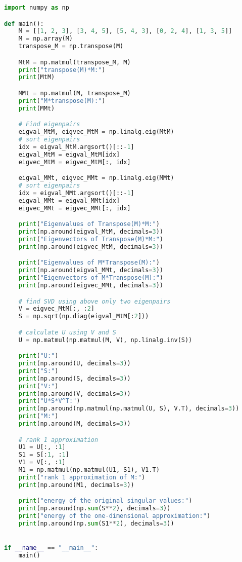 \documentclass{article}
\begin{document}
\begin{lstlisting}[language=Python]
import numpy as np

def main():
    M = [[1, 2, 3], [3, 4, 5], [5, 4, 3], [0, 2, 4], [1, 3, 5]]
    M = np.array(M)
    transpose_M = np.transpose(M)

    MtM = np.matmul(transpose_M, M)
    print("transpose(M)*M:")
    print(MtM)

    MMt = np.matmul(M, transpose_M)
    print("M*transpose(M):")
    print(MMt)

    # Find eigenpairs
    eigval_MtM, eigvec_MtM = np.linalg.eig(MtM)
    # sort eigenpairs
    idx = eigval_MtM.argsort()[::-1]
    eigval_MtM = eigval_MtM[idx]
    eigvec_MtM = eigvec_MtM[:, idx]

    eigval_MMt, eigvec_MMt = np.linalg.eig(MMt)
    # sort eigenpairs
    idx = eigval_MMt.argsort()[::-1]
    eigval_MMt = eigval_MMt[idx]
    eigvec_MMt = eigvec_MMt[:, idx]

    print("Eigenvalues of Transpose(M)*M:")
    print(np.around(eigval_MtM, decimals=3))
    print("Eigenvectors of Transpose(M)*M:")
    print(np.around(eigvec_MtM, decimals=3))

    print("Eigenvalues of M*Transpose(M):")
    print(np.around(eigval_MMt, decimals=3))
    print("Eigenvectors of M*Transpose(M):")
    print(np.around(eigvec_MMt, decimals=3))

    # find SVD using above only two eigenpairs
    V = eigvec_MtM[:, :2]
    S = np.sqrt(np.diag(eigval_MtM[:2]))

    # calculate U using V and S
    U = np.matmul(np.matmul(M, V), np.linalg.inv(S))

    print("U:")
    print(np.around(U, decimals=3))
    print("S:")
    print(np.around(S, decimals=3))
    print("V:")
    print(np.around(V, decimals=3))
    print("U*S*V^T:")
    print(np.around(np.matmul(np.matmul(U, S), V.T), decimals=3))
    print("M:")
    print(np.around(M, decimals=3))

    # rank 1 approximation
    U1 = U[:, :1]
    S1 = S[:1, :1]
    V1 = V[:, :1]
    M1 = np.matmul(np.matmul(U1, S1), V1.T)
    print("rank 1 approximation of M:")
    print(np.around(M1, decimals=3))

    print("energy of the original singular values:")
    print(np.around(np.sum(S**2), decimals=3))
    print("energy of the one-dimensional approximation:")
    print(np.around(np.sum(S1**2), decimals=3))


if __name__ == "__main__":
    main()

\end{lstlisting}
\end{document}
